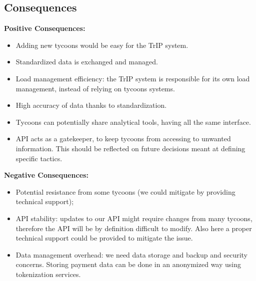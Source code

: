 \subsection*{Consequences}
\textbf{Positive Consequences:}
\begin{itemize}
    \item Adding new tycoons would be easy for the TrIP system.
    \item Standardized data is exchanged and managed.
    \item Load management efficiency: the TrIP system is responsible for its own load management, instead of relying on tycoons systems.
    \item High accuracy of data thanks to standardization.
    \item Tycoons can potentially share analytical tools, having all the same interface.
    \item API acts as a gatekeeper, to keep tycoons from accessing to unwanted information. This should be reflected on future decisions meant at defining specific tactics.
\end{itemize}
\textbf{Negative Consequences:}
\begin{itemize}
    \item Potential resistance from some tycoons (we could mitigate by providing technical support);
    \item API stability: updates to our API might require changes from many tycoons, therefore the API will be by definition difficult to modify. Also here a proper technical support could be provided to mitigate the issue.
    \item Data management overhead: we need data storage and backup and security concerns. Storing payment data can be done in an anonymized way using tokenization services.
\end{itemize}